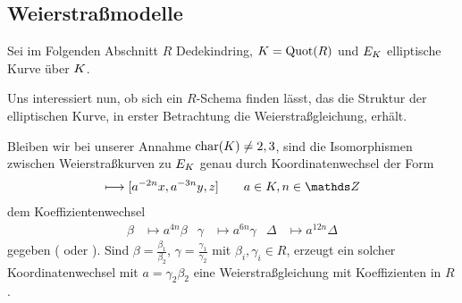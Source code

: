 \documentclass[german]{scrreprt}
\begin{document}
\subsection{Weierstraßmodelle}
Sei im Folgenden Abschnitt $R$ Dedekindring,
$K=\operatorname{Quot}(R)$ und $E_{K}$ elliptische Kurve über $K$.

Uns interessiert nun, ob sich ein $R$-Schema finden lässt, das die
Struktur der elliptischen Kurve, in erster Betrachtung die
Weierstraßgleichung, erhält.

Bleiben wir bei unserer Annahme $\operatorname{char}(K)\neq2,3$, sind die
Isomorphismen zwischen Weierstraßkurven zu $E_{K}$ genau durch
Koordinatenwechsel der Form
\begin{gather*}
  [x,y,z] \longmapsto [a^{-2n}x, a^{-3n}y, z] \qquad a\in\K, n\in\Z
\end{gather*}
dem Koeffizientenwechsel
\begin{align*}
  \beta&\mapsto a^{4n}\beta
  &\gamma&\mapsto a^{6n}\gamma
  &\Delta&\mapsto a^{12n}\Delta
\end{align*}
gegeben
(\cite[1.5, Lemma 2]{neron} oder \cite[Chapter VII.1]{silverman}).
Sind $\beta=\frac{\beta_1}{\beta_2}$,
$\gamma=\frac{\gamma_1}{\gamma_2}$ mit $\beta_i,\gamma_i\in R$,
erzeugt ein solcher Koordinatenwechsel mit $a=\gamma_2\beta_2$ eine
Weierstraßgleichung mit Koeffizienten in $R$.
\end{document}
